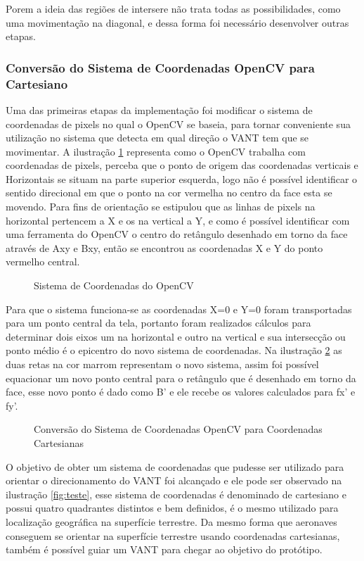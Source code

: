 Porem a ideia das regiões de intersere não trata todas as possibilidades, como uma movimentação na diagonal, e dessa forma foi necessário desenvolver outras etapas. 

\subsubsection{Conversão do Sistema de Coordenadas OpenCV para Cartesiano}

Uma das primeiras etapas da implementação foi modificar o sistema de coordenadas de pixels no qual o OpenCV se baseia, para tornar conveniente sua utilização no sistema que detecta em qual direção o VANT tem que se movimentar. A ilustração \ref{fig:quad1} representa como o OpenCV trabalha com coordenadas de pixels, perceba que o ponto de origem das coordenadas verticais e Horizontais se situam na parte superior esquerda, logo não é possível identificar o sentido direcional em que o ponto na cor vermelha no centro da face esta se movendo. Para fins de orientação se estipulou que as linhas de pixels na horizontal pertencem a X e os na vertical a Y, e como é possível identificar com uma ferramenta do OpenCV o centro do retângulo desenhado em torno da face através de Axy e Bxy, então se encontrou as coordenadas X e Y do ponto vermelho central.

\begin{figure}[H]
	\centering
	\caption{Sistema de Coordenadas do OpenCV}
	
	\label{fig:quad1}
\end{figure}

Para que o sistema funciona-se as coordenadas X=0 e Y=0 foram transportadas para um ponto central da tela, portanto foram realizados cálculos para determinar dois eixos um na horizontal e outro na vertical e sua intersecção ou ponto médio é o epicentro do novo sistema de coordenadas. Na ilustração \ref{fig:quad2} as duas retas na cor marrom representam o novo sistema, assim foi possível equacionar um novo ponto central para o retângulo que é  desenhado em torno da face, esse novo ponto é dado como B' e ele recebe os valores calculados para fx' e fy'.   

\begin{figure}[H]
	\centering
	\caption{Conversão do Sistema de Coordenadas OpenCV para Coordenadas Cartesianas}
	
	\label{fig:quad2}
\end{figure}

O objetivo de obter um sistema de coordenadas que pudesse ser utilizado para orientar o direcionamento do VANT foi alcançado e ele pode ser observado na ilustração \ref{fig:teste}, esse sistema de coordenadas é denominado de cartesiano e possui quatro quadrantes distintos e bem definidos, é o mesmo utilizado para localização geográfica na superfície terrestre. Da mesmo forma que aeronaves conseguem se orientar na superfície terrestre usando coordenadas cartesianas, também é possível guiar um VANT para chegar ao objetivo do protótipo.

